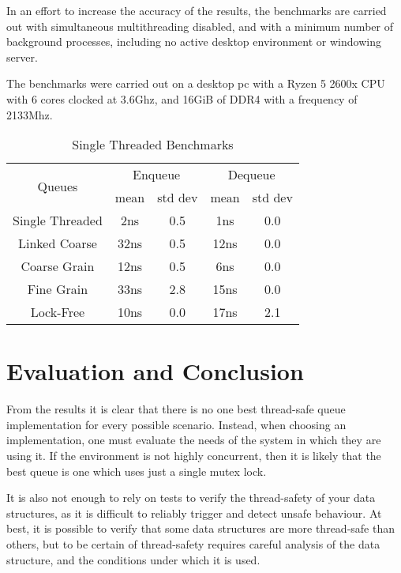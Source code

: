\documentclass{article}
\begin{document}
In an effort to increase the accuracy of the results, the benchmarks are carried
out with simultaneous multithreading disabled, and with a minimum number of
background processes, including no active desktop environment or windowing
server.

The benchmarks were carried out on a desktop pc with a Ryzen 5 2600x CPU with 6
cores clocked at 3.6Ghz, and 16GiB of DDR4 with a frequency of 2133Mhz.

\begin{table}[h]
\centering
\begin{tabular}{c|cccc}
\hline
\multirow{2}{*}{Queues} & \multicolumn{2}{c}{Enqueue} & \multicolumn{2}{c}{Dequeue} \\
                        & mean        & std dev       & mean        & std dev       \\ \hline
Single Threaded         & 2ns         & 0.5           & 1ns         & 0.0           \\
Linked Coarse           & 32ns        & 0.5           & 12ns        & 0.0           \\
Coarse Grain            & 12ns        & 0.5           & 6ns         & 0.0           \\
Fine Grain              & 33ns        & 2.8           & 15ns        & 0.0           \\
Lock-Free               & 10ns        & 0.0           & 17ns        & 2.1          
\end{tabular}
\caption{Single Threaded Benchmarks}
\label{tab:single-threaded}
\end{table}

\section{Evaluation and Conclusion}
From the results it is clear that there is no one best thread-safe queue
implementation for every possible scenario. Instead, when choosing an
implementation, one must evaluate the needs of the system in which they are
using it. If the environment is not highly concurrent, then it is likely that
the best queue is one which uses just a single mutex lock.  

It is also not enough to rely on tests to verify the thread-safety of your
data structures, as it is difficult to reliably trigger and detect unsafe
behaviour. At best, it is possible to verify that some data structures are more
thread-safe than others, but to be certain of thread-safety requires careful
analysis of the data structure, and the conditions under which it is used.

\nocite{*}

\end{document}
